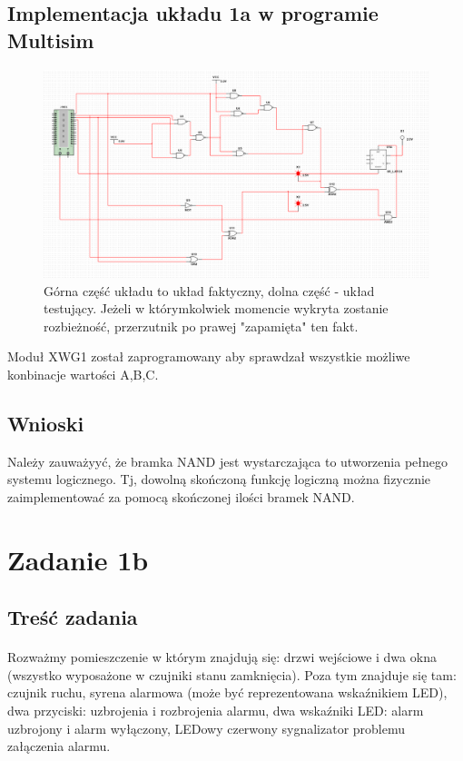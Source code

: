 \documentclass{article}
\begin{document}
\subsection{Implementacja układu 1a w programie Multisim}
\begin{figure}[h!]
\includegraphics[width=\textwidth]{1a}
\caption{Górna część układu to układ faktyczny, dolna część - układ testujący. Jeżeli w którymkolwiek momencie wykryta zostanie rozbieżność, przerzutnik po prawej "zapamięta" ten fakt.}
\end{figure}
Moduł XWG1 został zaprogramowany aby sprawdzał wszystkie możliwe konbinacje wartości A,B,C.
\subsection{Wnioski}
Należy zauważyyć, że bramka NAND jest wystarczająca to utworzenia pełnego systemu logicznego. Tj, dowolną skończoną funkcję logiczną można fizycznie zaimplementować za pomocą skończonej ilości bramek NAND. 
\newpage
\section{Zadanie 1b}
\subsection{Treść zadania}
\paragraph{}
Rozważmy pomieszczenie w którym znajdują się: drzwi wejściowe i dwa okna (wszystko wyposażone w czujniki stanu zamknięcia). Poza tym znajduje się tam: czujnik ruchu, syrena alarmowa (może być reprezentowana wskaźnikiem LED), dwa przyciski: uzbrojenia i rozbrojenia alarmu, dwa wskaźniki LED: alarm uzbrojony i alarm wyłączony, LEDowy czerwony sygnalizator problemu załączenia alarmu.
\end{document}
